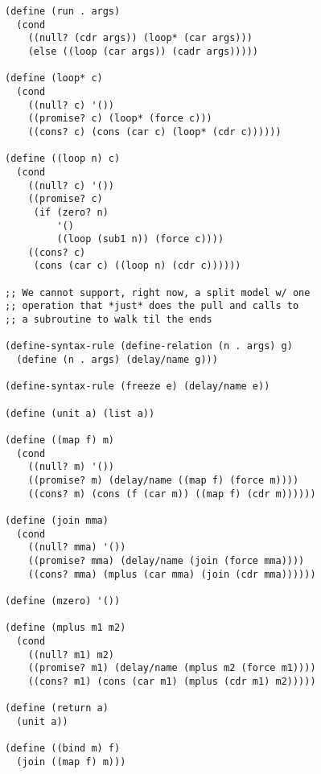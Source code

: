 \documentclass[screen,anonymous,review,draft,natbib=false]{acmart} %
\begin{document}

\begin{listing}
\begin{verbatim}
(define (run . args)
  (cond
    ((null? (cdr args)) (loop* (car args)))
    (else ((loop (car args)) (cadr args)))))

(define (loop* c)
  (cond
    ((null? c) '())
    ((promise? c) (loop* (force c)))
    ((cons? c) (cons (car c) (loop* (cdr c))))))

(define ((loop n) c)
  (cond
    ((null? c) '())
    ((promise? c)
     (if (zero? n)
         '()
         ((loop (sub1 n)) (force c))))
    ((cons? c)
     (cons (car c) ((loop n) (cdr c))))))

;; We cannot support, right now, a split model w/ one 
;; operation that *just* does the pull and calls to 
;; a subroutine to walk til the ends

(define-syntax-rule (define-relation (n . args) g)
  (define (n . args) (delay/name g)))

(define-syntax-rule (freeze e) (delay/name e))

(define (unit a) (list a))

(define ((map f) m)
  (cond
    ((null? m) '())
    ((promise? m) (delay/name ((map f) (force m))))
    ((cons? m) (cons (f (car m)) ((map f) (cdr m))))))

(define (join mma)
  (cond
    ((null? mma) '()) 
    ((promise? mma) (delay/name (join (force mma))))
    ((cons? mma) (mplus (car mma) (join (cdr mma))))))

(define (mzero) '())

(define (mplus m1 m2)
  (cond
    ((null? m1) m2)
    ((promise? m1) (delay/name (mplus m2 (force m1))))
    ((cons? m1) (cons (car m1) (mplus (cdr m1) m2)))))

(define (return a)
  (unit a))

(define ((bind m) f)
  (join ((map f) m)))
\end{verbatim}
\end{listing}
\end{document}
